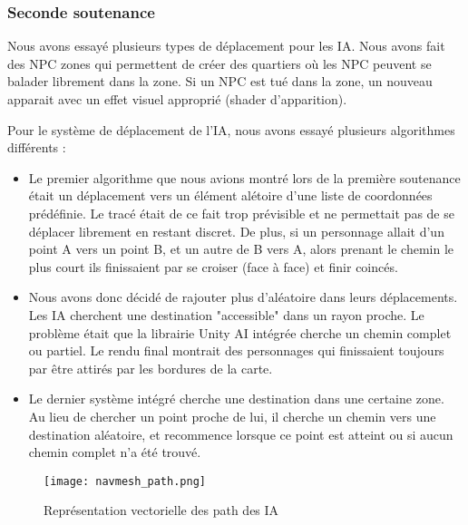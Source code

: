     \subsubsection{Seconde soutenance}


        Nous avons essayé plusieurs types de déplacement pour les IA. Nous avons fait des NPC zones qui permettent de créer des quartiers
        où les NPC peuvent se balader librement dans la zone. Si un NPC est tué dans la zone, un nouveau apparait avec un effet visuel 
        approprié (shader d'apparition).
        

        Pour le système de déplacement de l'IA,
        nous avons essayé plusieurs algorithmes différents :
        
        \begin{itemize}
            \item Le premier algorithme que nous avions montré lors de la première soutenance
            était un déplacement vers un élément alétoire d'une liste de coordonnées prédéfinie.
            Le tracé était de ce fait trop prévisible et ne permettait pas de se déplacer librement en restant discret.
            De plus, si un personnage allait d'un point A vers un point B, et un autre de B vers A,
            alors prenant le chemin le plus court ils finissaient par se croiser (face à face) et finir coincés.
            
            \item Nous avons donc décidé de rajouter plus d'aléatoire dans leurs déplacements. Les IA cherchent une 
            destination "accessible" dans un rayon proche. Le problème était que la librairie Unity AI intégrée 
            cherche un chemin complet ou partiel. Le rendu final montrait des personnages qui finissaient toujours 
            par être attirés par les bordures de la carte.

            \item Le dernier système intégré cherche une destination dans une certaine zone.
            Au lieu de chercher un point proche de lui, il cherche un chemin vers une destination aléatoire, 
            et recommence lorsque ce point est atteint ou si aucun chemin complet n'a été trouvé.
        \end{itemize}
            

        \begin{figure}[hbt!]
            \centering
            \texttt{[image: navmesh\_path.png]}
            \caption{Représentation vectorielle des path des IA}
        \end{figure}
        
